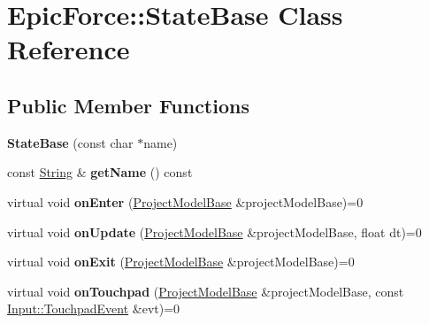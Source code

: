 \hypertarget{class_epic_force_1_1_state_base}{}\section{Epic\+Force\+:\+:State\+Base Class Reference}
\label{class_epic_force_1_1_state_base}
\subsection*{Public Member Functions}
\begin{DoxyCompactItemize}
\item 
{\bfseries State\+Base} (const char $\ast$name)\hypertarget{class_epic_force_1_1_state_base_a10e4112288f8bf63d19225997e64c5b2}{}\label{class_epic_force_1_1_state_base_a10e4112288f8bf63d19225997e64c5b2}

\item 
const \hyperlink{class_magnum_1_1_string}{String} \& {\bfseries get\+Name} () const \hypertarget{class_epic_force_1_1_state_base_a80956eec81f213ae99415ace1bc703db}{}\label{class_epic_force_1_1_state_base_a80956eec81f213ae99415ace1bc703db}

\item 
virtual void {\bfseries on\+Enter} (\hyperlink{class_epic_force_1_1_project_model_base}{Project\+Model\+Base} \&project\+Model\+Base)=0\hypertarget{class_epic_force_1_1_state_base_a538089f451125ed57129112232cb47b4}{}\label{class_epic_force_1_1_state_base_a538089f451125ed57129112232cb47b4}

\item 
virtual void {\bfseries on\+Update} (\hyperlink{class_epic_force_1_1_project_model_base}{Project\+Model\+Base} \&project\+Model\+Base, float dt)=0\hypertarget{class_epic_force_1_1_state_base_a422beeeea6409e340529a7dadbaa45dc}{}\label{class_epic_force_1_1_state_base_a422beeeea6409e340529a7dadbaa45dc}

\item 
virtual void {\bfseries on\+Exit} (\hyperlink{class_epic_force_1_1_project_model_base}{Project\+Model\+Base} \&project\+Model\+Base)=0\hypertarget{class_epic_force_1_1_state_base_a6288ddf4f1f3e31c5f6c13e689a6f981}{}\label{class_epic_force_1_1_state_base_a6288ddf4f1f3e31c5f6c13e689a6f981}

\item 
virtual void {\bfseries on\+Touchpad} (\hyperlink{class_epic_force_1_1_project_model_base}{Project\+Model\+Base} \&project\+Model\+Base, const \hyperlink{class_magnum_1_1_input_1_1_touchpad_event}{Input\+::\+Touchpad\+Event} \&evt)=0\hypertarget{class_epic_force_1_1_state_base_acef46b7376d7d249c3e4fffe0a2f0a31}{}\label{class_epic_force_1_1_state_base_acef46b7376d7d249c3e4fffe0a2f0a31}


\end{DoxyCompactItemize}
